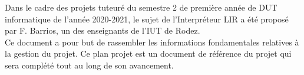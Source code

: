 
\Large
Dans le cadre des projets tuteuré du semestre 2 de première année de
DUT informatique de l’année 2020-2021, le sujet de l’Interpréteur LIR
a été proposé par F. Barrios, un des enseignants de l’IUT de Rodez.
\\Ce document a pour but de rassembler les informations fondamentales
relatives à la gestion du projet. Ce plan projet est un document de
référence du projet qui sera complété tout au long de son avancement.

\normalsize